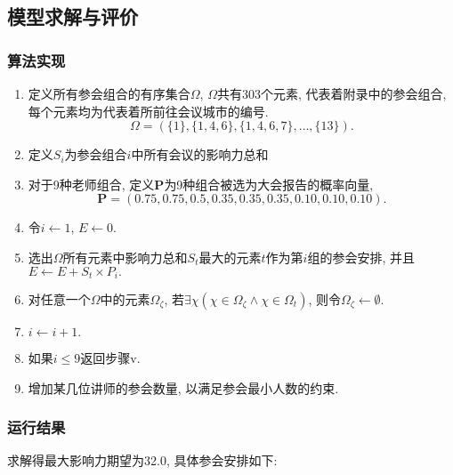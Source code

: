 \subsection{模型求解与评价}
    \subsubsection{算法实现}
        \begin{enumerate}[Step 1.]
            \item 定义所有参会组合的有序集合$\Omega$, $\Omega$共有303个元素, 代表着附录中的参会组合,
                    每个元素均为代表着所前往会议城市的编号.
                    \[\Omega=(\{1\}, \{1, 4, 6\}, \{1, 4, 6, 7\}, \dotsc, \{13\}).\]
            \item 定义$S_{i}$为参会组合$i$中所有会议的影响力总和
            \item 对于9种老师组合, 定义$\boldsymbol P$为9种组合被选为大会报告的概率向量,
                    \[{\boldsymbol P}=(0.75, 0.75, 0.5, 0.35, 0.35, 0.35, 0.10, 0.10, 0.10).\]
            \item 令$i \leftarrow 1$, $E \leftarrow 0.$
            \item 选出$\Omega$所有元素中影响力总和$S_{t}$最大的元素$t$作为第$i$组的参会安排,
                    并且$E \leftarrow E + S_{t}\times P_{i}.$
            \item 对任意一个$\Omega$中的元素$\Omega_{\zeta}$,
                    若$\exists \chi (\chi \in \Omega_{\zeta} \wedge \chi \in \Omega_{t})$,
                    则令$\Omega_{\zeta} \leftarrow \emptyset.$
            \item $i \leftarrow i+1.$
            \item 如果$i\le 9$返回步骤v.
            \item 增加某几位讲师的参会数量, 以满足参会最小人数的约束.
        \end{enumerate}
    \subsubsection{运行结果}
        求解得最大影响力期望为32.0, 具体参会安排如下:
        

